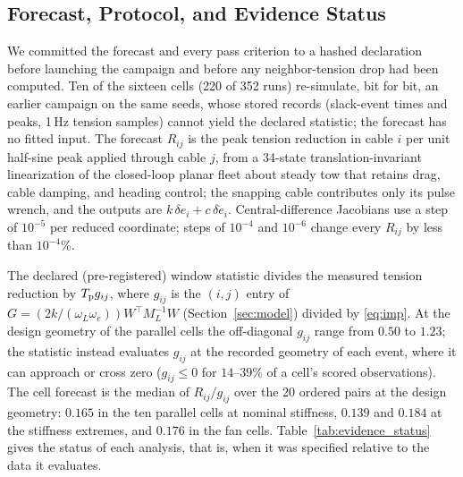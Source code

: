 \subsection{Forecast, Protocol, and Evidence Status}
\label{subsec:forecast}

We committed the forecast and every pass criterion to a hashed declaration \cite{nosek2018preregistration,siepe2024simulation} before launching the campaign and before any neighbor-tension drop had been computed. Ten of the sixteen cells (220 of 352 runs) re-simulate, bit for bit, an earlier campaign on the same seeds, whose stored records (slack-event times and peaks, 1\,Hz tension samples) cannot yield the declared statistic; the forecast has no fitted input. The forecast $R_{ij}$ is the peak tension reduction in cable $i$ per unit half-sine peak applied through cable $j$, from a 34-state translation-invariant linearization of the closed-loop planar fleet about steady tow that retains drag, cable damping, and heading control; the snapping cable contributes only its pulse wrench, and the outputs are $k\,\delta e_i+c\,\delta\dot{e}_i$. Central-difference Jacobians use a step of $10^{-5}$ per reduced coordinate; steps of $10^{-4}$ and $10^{-6}$ change every $R_{ij}$ by less than $10^{-4}$\%.

The declared (pre-registered) window statistic divides the measured tension reduction by $T_{\mathrm{p}} g_{ij}$, where $g_{ij}$ is the $(i,j)$ entry of $G=(2k/(\omega_L\omega_e))W^\top M_L^{-1}W$ (Section~\ref{sec:model}) divided by \eqref{eq:imp}. At the design geometry of the parallel cells the off-diagonal $g_{ij}$ range from $0.50$ to $1.23$; the statistic instead evaluates $g_{ij}$ at the recorded geometry of each event, where it can approach or cross zero ($g_{ij}\le0$ for $14$--$39$\% of a cell's scored observations). The cell forecast is the median of $R_{ij}/g_{ij}$ over the 20 ordered pairs at the design geometry: $0.165$ in the ten parallel cells at nominal stiffness, $0.139$ and $0.184$ at the stiffness extremes, and $0.176$ in the fan cells. Table~\ref{tab:evidence_status} gives the status of each analysis, that is, when it was specified relative to the data it evaluates.

